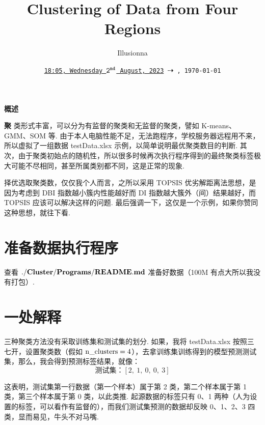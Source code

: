 \documentclass[oneside,UTF8]{article}
\title{\bf Clustering of Data from Four Regions}
\author{Illusionna}
\date{\tt\small \underline{18:05, Wednesday $\tt2^{nd}$ August, 2023} $\dashrightarrow$ \xxivtime,\ \today}
\numberwithin{figure}{section}
\numberwithin{table}{section}
\numberwithin{equation}{section}
\newcommand*{\purple}{\color{red!200!green!20!blue!20}}
\newcommand*{\shallowRed}{\color[rgb]{1 0.2 0.5}}
\begin{document}
\maketitle

\setcounter{page}{1}
\fancyhead[L]{\purple\rightmark}
\fancyhead[R]{}
\fancyhead[C]{}
\fancyfoot[C]{\normalsize--\ \thepage\ --}
\thispagestyle{fancy}

\centerline{\bf\large 概述}

\begin{multicols}{2}
\lettrine[lines=2]{\bf 聚}{} 类形式丰富，可以分为有监督的聚类和无监督的聚类，譬如 K-means、GMM、SOM 等. 由于本人电脑性能不足，无法跑程序，学校服务器远程用不来，所以虚拟了一组数据 testData.xlsx 示例，以简单说明最优聚类数目的判断. 其次，由于聚类初始点的随机性，所以很多时候再次执行程序得到的最终聚类标签极大可能不尽相同，甚至所属类别都不同，这是正常的现象.

择优选取聚类数，仅仅我个人而言，之所以采用 TOPSIS 优劣解距离法思想，是因为考虑到 DBI 指数越小簇内性能越好而 DI 指数越大簇外（间）结果越好，而 TOPSIS 应该可以解决这样的问题. {\shallowRed 最后强调一下，这仅是一个示例，如果你赞同这种思想，就往下看.}

\end{multicols}
\pagestyle{fancy}
\section{准备数据执行程序}
查看 $\rm\bf{./Cluster/Programs/README.md}$ 准备好数据（100M 有点大所以我没有打包）.



\section{一处解释}
三种聚类方法没有采取训练集和测试集的划分. 如果，我将 testData.xlsx 按照三七开，设置聚类数（假如 $\rm n\_clusters=4$），去拿训练集训练得到的模型预测测试集，那么，我会得到预测标签结果，就像：
\[ \mbox{测试集：}[2,\ 1,\ 0,\ 0,\ 3] \]

这表明，测试集第一行数据（第一个样本）属于第 2 类，第二个样本属于第 1 类，第三个样本属于第 0 类，以此类推. 起源数据的标签只有 0、1 两种（人为设置的标签，可以看作有监督的），而我们测试集预测的数据却反映 0、1、2、3 四类，显而易见，牛头不对马嘴.
\end{document}
